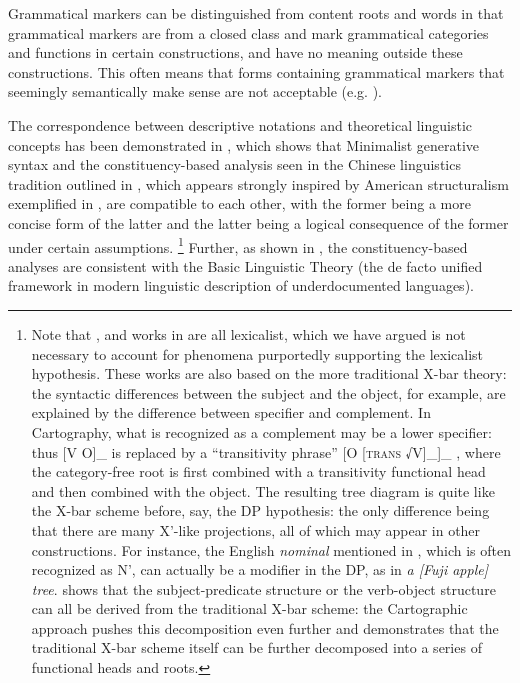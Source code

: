 \documentclass[UTF8, a4paper, oneside, scheme=plain, 12pt]{ctexrep}
\newcommand*{\term}[1]{\emph{#1}}
\newcommand{\form}[1]{\emph{#1}}
\newcommand*{\category}[1]{\textsc{#1}}
\begin{document}
{Grammatical markers can be distinguished from content roots and words in that 
grammatical markers are from a closed class and mark grammatical categories and functions in certain constructions, and have no meaning outside these constructions.
This often means that forms containing grammatical markers that seemingly semantically make sense are not acceptable (e.g. ).

The correspondence between descriptive notations and theoretical linguistic concepts has been demonstrated in \citet{deng2010},
which shows that Minimalist generative syntax and the constituency-based analysis seen in the Chinese linguistics tradition outlined in , which appears strongly inspired by American structuralism exemplified in \citet{cgel}, are compatible to each other,
with the former being a more concise form of the latter 
and the latter being a logical consequence of the former under certain assumptions.%
\footnote{
    Note that \citet{deng2010}, \citet{cgel} and works in  are all lexicalist, which we have argued is not necessary to account for phenomena purportedly supporting the lexicalist hypothesis.
    These works are also based on the more traditional X-bar theory:
    the syntactic differences between the subject and the object, for example,
    are explained by the difference between specifier and complement.
    In Cartography, what is recognized as a complement may be a lower specifier:
    thus [V O]_{} is replaced by a ``transitivity phrase'' [O [\category{trans} √V]_{\text{\category{trans}'}}]_{\text{\category{trans}P}} \citep{siddiqi2009syntax},
    where the category-free root is first combined with a transitivity functional head and then combined with the object.
    The resulting tree diagram is quite like the X-bar scheme before, say, the DP hypothesis:
    the only difference being that there are many X'-like projections, all of which may appear in other constructions.
    For instance, the English \term{nominal} mentioned in \citet{cgel}, which is often recognized as N', can actually be a modifier in the DP,
    as in \form{a [Fuji apple] tree}.
    \citet{deng2010} shows that the subject-predicate structure or the verb-object structure can all be derived from the traditional X-bar scheme:
    the Cartographic approach pushes this decomposition even further and demonstrates that the traditional X-bar scheme itself can be further decomposed into a series of functional heads and roots.
} 
Further, as shown in ,
the constituency-based analyses are consistent with the Basic Linguistic Theory (the de facto unified framework in modern linguistic description of underdocumented languages).

}
\end{document}
